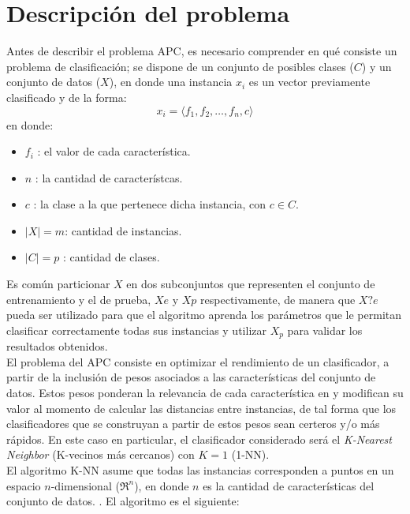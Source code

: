 \documentclass{ci5652}
\begin{document}

\section{Descripción del problema}

Antes de describir el problema APC, es necesario comprender en qué consiste
un problema de clasificación; se dispone de un conjunto de posibles clases
($C$) y un conjunto de datos ($X$), en donde una instancia $x_i$ es un vector
previamente clasificado y de la forma:
$$x_i = \langle f_1, f_2, \dots, f_n, c\rangle $$ en donde:

\begin{itemize}
  \item $f_i$ : el valor de cada característica.
  \item $n$ : la cantidad de característcas.
  \item $c$ : la clase a la que pertenece dicha instancia, con $c \in C$.
  \item $|X| = m$: cantidad de instancias.
  \item $|C| = p$ : cantidad de clases.
\end{itemize}

Es común particionar $X$ en dos subconjuntos que representen el conjunto de
entrenamiento y el de prueba, $Xe$ y $Xp$ respectivamente, de manera que $X?e$
pueda ser utilizado para que el algoritmo aprenda los parámetros que le
permitan clasificar correctamente todas sus instancias y utilizar $X_p$ para
validar los resultados obtenidos.\\

El problema del APC consiste en optimizar el rendimiento de un clasificador, a
partir de la inclusión de pesos asociados a las características del conjunto de
datos. Estos pesos ponderan la relevancia de cada característica en y modifican
su valor al momento de calcular las distancias entre instancias, de tal forma 
que los clasificadores que se construyan a partir de estos pesos sean certeros 
y/o más rápidos. En este caso en particular, el clasificador considerado será el
\textit{K-Nearest Neighbor} (K-vecinos más cercanos) con $K=1$ (1-NN).\\

El algoritmo K-NN asume que todas las instancias corresponden a puntos en un
espacio $n$-dimensional ($\Re^n$), en donde $n$ es la cantidad de
características del conjunto de datos. \cite{Mitchell_1997}. El algoritmo es el
siguiente:
\end{document}
